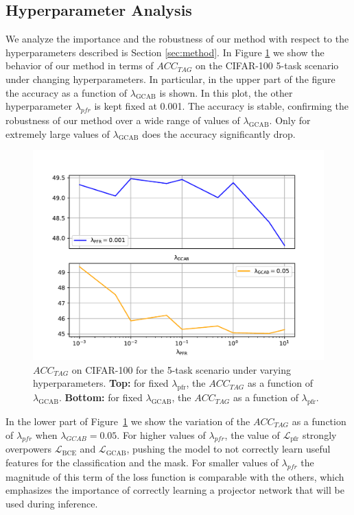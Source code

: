\documentclass[twocolumn]{svjour3}          %
\begin{document}
\subsection{Hyperparameter Analysis}
We analyze the importance and the robustness of our method with respect to the hyperparameters described is Section \ref{sec:method}. In Figure \ref{fig:hyperparam} we show the behavior of our method in terms of $ACC_{TAG}$ on the CIFAR-100 5-task scenario under changing hyperparameters. In particular, in the upper part of the figure the accuracy as a function of $\lambda_{\mathrm{GCAB}}$  is shown. In this plot, the other hyperparameter $\lambda_{pfr}$ is kept fixed  at 0.001. The accuracy is stable, confirming the robustness of our method over a wide range of values of $\lambda_{\mathrm{GCAB}}$. Only for extremely large values of $\lambda_{\mathrm{GCAB}}$ does the accuracy significantly drop.
\begin{figure}
    \centering
    \hspace*{-0.2in}
    \includegraphics[width=\linewidth]{images/params_plot.pdf}
    \vspace{-0.2cm}
    \caption{$ACC_{TAG}$ on CIFAR-100 for the 5-task scenario under varying  hyperparameters. \textbf{Top:} for fixed $\lambda_{\mathrm{pfr}}$, the $ACC_{TAG}$ as a function of $\lambda_{\mathrm{GCAB}}$. \textbf{Bottom:} for fixed $\lambda_{\mathrm{GCAB}}$, the $ACC_{TAG}$ as a function of $\lambda_{\mathrm{pfr}}$.}
    \label{fig:hyperparam}
\end{figure}

In the lower part of Figure~\ref{fig:hyperparam} we show the variation of the $ACC_{TAG}$ as a function of $\lambda_{pfr}$ when $\lambda_{GCAB}=0.05$. For higher values of $\lambda_{pfr}$, the value of $\mathcal{L}_{\text{pfr}}$ strongly overpowers $\mathcal{L}_{\text{BCE}}$ and  $\mathcal{L}_{\text{GCAB}}$, pushing the model to not correctly learn useful features for the classification and the mask. For smaller values of $\lambda_{pfr}$ the magnitude of this term of the loss function is comparable with the others, which emphasizes the importance of correctly learning a projector network that will be used during inference.
\end{document}
